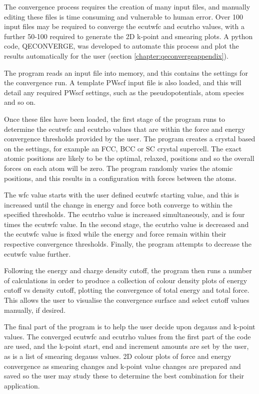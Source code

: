 The convergence process requires the creation of many input files, and manually editing these files is time consuming and vulnerable to human error. Over 100 input files may be required to converge the ecutwfc and ecutrho values, with a further 50-100 required to generate the 2D k-point and smearing plots.  A python code, QECONVERGE, was developed to automate this process and plot the results automatically for the user (section \ref{chapter:qeconvergeappendix}).

The program reads an input file into memory, and this contains the settings for the convergence run.  A template PWscf input file is also loaded, and this will detail any required PWscf settings, such as the pseudopotentials, atom species and so on.  

Once these files have been loaded, the first stage of the program runs to determine the ecutwfc and ecutrho values that are within the force and energy convergence thresholds provided by the user.  The program creates a crystal based on the settings, for example an FCC, BCC or SC crystal supercell.  The exact atomic positions are likely to be the optimal, relaxed, positions and so the overall forces on each atom will be zero.  The program randomly varies the atomic positions, and this results in a configuration with forces between the atoms.

The wfc value starts with the user defined ecutwfc starting value, and this is increased until the change in energy and force both converge to within the specified thresholds.  The ecutrho value is increased simultaneously, and is four times the ecutwfc value.  In the second stage, the ecutrho value is decreased and the ecutwfc value is fixed while the energy and force remain within their respective convergence thresholds.  Finally, the program attempts to decrease the ecutwfc value further.

Following the energy and charge density cutoff, the program then runs a number of calculations in order to produce a collection of colour density plots of energy cutoff vs density cutoff, plotting the convergence of total energy and total force.  This allows the user to visualise the convergence surface and select cutoff values manually, if desired.

The final part of the program is to help the user decide upon degauss and k-point values.  The converged ecutwfc and ecutrho values from the first part of the code are used, and the k-point start, end and increment amounts are set by the user, as is a list of smearing degauss values.  2D colour plots of force and energy convergence as smearing changes and k-point value changes are prepared and saved so the user may study these to determine the best combination for their application.

